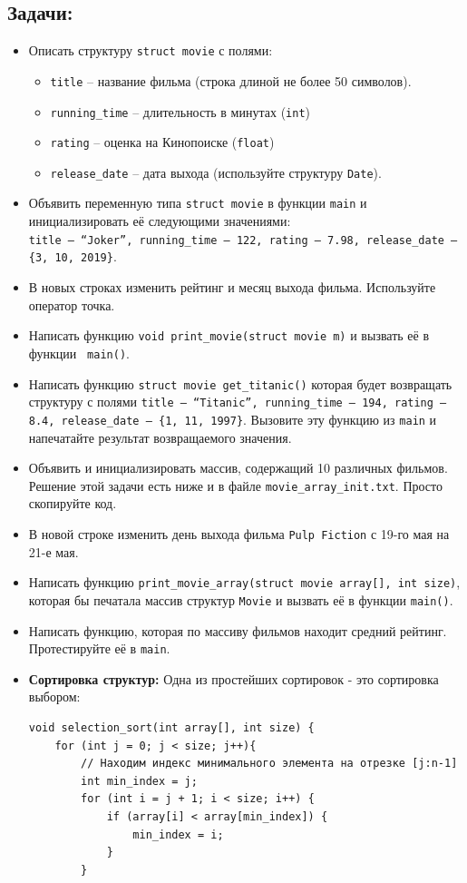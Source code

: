 \documentclass{article}
\begin{document}
\subsection*{Задачи:}
\begin{itemize}
\item Описать структуру \texttt{struct movie} с полями: 
\begin{itemize}
\item \texttt{title} -- название фильма (строка длиной не более 50 символов).
\item \texttt{running\_time} -- длительность в минутах (\texttt{int})
\item \texttt{rating} -- оценка на Кинопоиске (\texttt{float})
\item \texttt{release\_date} -- дата выхода (используйте структуру \texttt{Date}).
\end{itemize}
\item Объявить переменную типа \texttt{struct movie} в функции \texttt{main} и инициализировать её следующими значениями:\\
\texttt{title -- ``Joker'', running\_time -- 122, rating -- 7.98, release\_date -- \{3, 10, 2019\}}.
\item В новых строках изменить рейтинг и месяц выхода фильма. Используйте оператор точка.
\item Написать функцию \texttt{void print\_movie(struct movie m)} и вызвать её в функции \texttt{ main()}.
\item Написать функцию \texttt{struct movie get\_titanic()} которая будет возвращать структуру с полями \texttt{title -- ``Titanic'',  running\_time -- 194, rating -- 8.4, release\_date -- \{1, 11, 1997\}}. Вызовите эту функцию из \texttt{main} и напечатайте результат возвращаемого значения.
\item Объявить и инициализировать массив, содержащий 10 различных фильмов. Решение этой задачи есть ниже и в файле \texttt{movie\_array\_init.txt}. Просто скопируйте код.
\item В новой строке изменить день выхода фильма \texttt{Pulp Fiction} с 19-го мая на 21-е мая.
\item Написать функцию \texttt{print\_movie\_array(struct movie array[], int size)}, которая бы печатала массив структур \texttt{Movie} и вызвать её в функции \texttt{main()}.
\item Написать функцию, которая по массиву фильмов находит средний рейтинг. Протестируйте её в \texttt{main}.

\item \textbf{Сортировка структур:} Одна из простейших сортировок - это сортировка выбором:
\begin{lstlisting}
void selection_sort(int array[], int size) {
    for (int j = 0; j < size; j++){
        // Находим индекс минимального элемента на отрезке [j:n-1]
        int min_index = j;
        for (int i = j + 1; i < size; i++) {
            if (array[i] < array[min_index]) {
                min_index = i;
            }
        }
		

\end{lstlisting}
\end{itemize}
\end{document}
